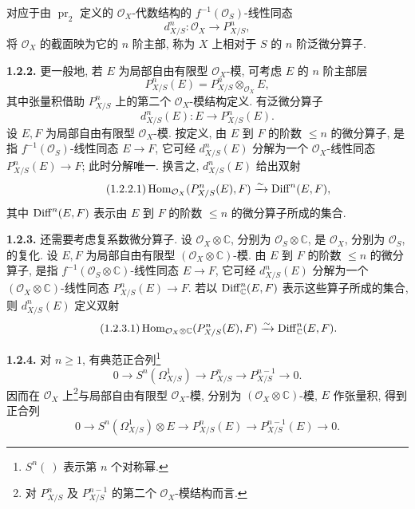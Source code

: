 对应于由 $\operatorname{pr}_2$ 定义的 $\mathcal O_X$-代数结构的 $f^{-1}(\mathcal O_S)$-线性同态
\[
 d^n_{X/S}:\mathcal O_X\longrightarrow P^n_{X/S},
\]
将 $\mathcal O_X$ 的截面映为它的 $n$ 阶主部, 称为 $X$ 上相对于 $S$ 的 $n$ 阶泛微分算子.

\textbf{1.2.2.} 更一般地, 若 $E$ 为局部自由有限型 $\mathcal O_X$-模, 可考虑 $E$ 的 $n$ 阶主部层
\[
 P^n_{X/S}(E)=P^n_{X/S}\otimes_{\mathcal O_X}E,
\]
其中张量积借助 $P^n_{X/S}$ 上的第二个 $\mathcal O_X$-模结构定义. 有泛微分算子
\[
 d^n_{X/S}(E):E\longrightarrow P^n_{X/S}(E).
\]
设 $E,F$ 为局部自由有限型 $\mathcal O_X$-模. 按定义, 由 $E$ 到 $F$ 的阶数 $\le n$ 的微分算子, 是指 $f^{-1}(\mathcal O_S)$-线性同态 $E\to F$, 它可经 $d^n_{X/S}(E)$ 分解为一个 $\mathcal O_X$-线性同态 $P^n_{X/S}(E)\to F$; 此时分解唯一. 换言之, $d^n_{X/S}(E)$ 给出双射
\begin{equation}\tag{1.2.2.1}
 \operatorname{Hom}_{\mathcal O_X}(P^n_{X/S}(E),F)\xrightarrow{\sim}\operatorname{Diff}^n(E,F),
\end{equation}
其中 $\operatorname{Diff}^n(E,F)$ 表示由 $E$ 到 $F$ 的阶数 $\le n$ 的微分算子所成的集合.

\textbf{1.2.3.} 还需要考虑复系数微分算子. 设 $\mathcal O_X\otimes\mathbb C$, 分别为 $\mathcal O_S\otimes\mathbb C$, 是 $\mathcal O_X$, 分别为 $\mathcal O_S$, 的复化. 设 $E,F$ 为局部自由有限型 $(\mathcal O_X\otimes\mathbb C)$-模. 由 $E$ 到 $F$ 的阶数 $\le n$ 的微分算子, 是指 $f^{-1}(\mathcal O_S\otimes\mathbb C)$-线性同态 $E\to F$, 它可经 $d^n_{X/S}(E)$ 分解为一个 $(\mathcal O_X\otimes\mathbb C)$-线性同态 $P^n_{X/S}(E)\to F$. 若以 $\operatorname{Diff}^n_{\mathbb C}(E,F)$ 表示这些算子所成的集合, 则 $d^n_{X/S}(E)$ 定义双射
\begin{equation}\tag{1.2.3.1}
 \operatorname{Hom}_{\mathcal O_X\otimes\mathbb C}(P^n_{X/S}(E),F)
 \xrightarrow{\sim}\operatorname{Diff}^n_{\mathbb C}(E,F).
\end{equation}

\textbf{1.2.4.} 对 $n\ge1$, 有典范正合列\footnote{$S^n(\ )$ 表示第 $n$ 个对称幂.}
\[
 0\longrightarrow S^n(\Omega^1_{X/S})\longrightarrow P^n_{X/S}
 \longrightarrow P^{n-1}_{X/S}\longrightarrow 0.
\]
因而在 $\mathcal O_X$ 上\footnote{对 $P^n_{X/S}$ 及 $P^{n-1}_{X/S}$ 的第二个 $\mathcal O_X$-模结构而言.}与局部自由有限型 $\mathcal O_X$-模, 分别为 $(\mathcal O_X\otimes\mathbb C)$-模, $E$ 作张量积, 得到正合列
\begin{equation}\tag{1.2.4.1}
0\longrightarrow S^n(\Omega^1_{X/S})\otimes E\longrightarrow P^n_{X/S}(E)
\longrightarrow P^{n-1}_{X/S}(E)\longrightarrow0.
\end{equation}


